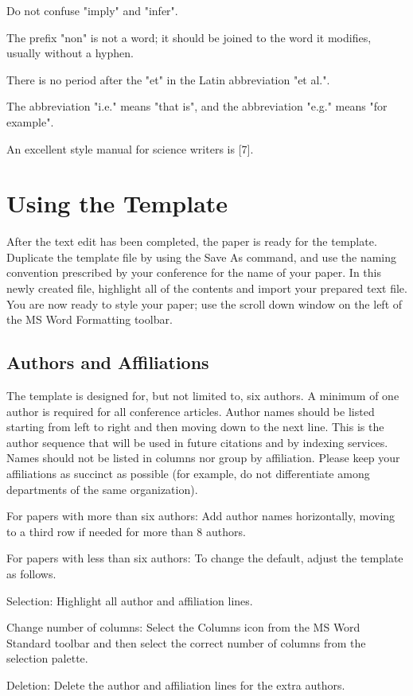 \documentclass[10pt, conference, compsocconf]{IEEEtran}
\begin{document}
Do not confuse "imply" and "infer".

The prefix "non" is not a word; it should be joined to the word it modifies, usually without a hyphen.

There is no period after the "et" in the Latin abbreviation "et al.".

The abbreviation "i.e." means "that is", and the abbreviation "e.g." means "for example".

An excellent style manual for science writers is [7].

\section{Using the Template}
After the text edit has been completed, the paper is ready for the template. Duplicate the template file by using the Save As command, and use the naming convention prescribed by your conference for the name of your paper. In this newly created file, highlight all of the contents and import your prepared text file. You are now ready to style your paper; use the scroll down window on the left of the MS Word Formatting toolbar.

\subsection{Authors and Affiliations}
The template is designed for, but not limited to, six authors. A minimum of one author is required for all conference articles. Author names should be listed starting from left to right and then moving down to the next line. This is the author sequence that will be used in future citations and by indexing services. Names should not be listed in columns nor group by affiliation. Please keep your affiliations as succinct as possible (for example, do not differentiate among departments of the same organization).

For papers with more than six authors: Add author names horizontally, moving to a third row if needed for more than 8 authors.

For papers with less than six authors: To change the default, adjust the template as follows.

Selection: Highlight all author and affiliation lines.

Change number of columns: Select the Columns icon from the MS Word Standard toolbar and then select the correct number of columns from the selection palette.

Deletion: Delete the author and affiliation lines for the extra authors.
\end{document}
